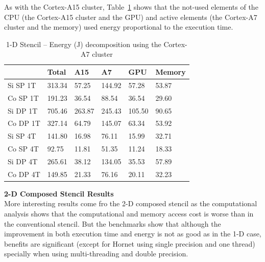 \documentclass{acm_proc_article-sp}
\begin{document}
As with the Cortex-A15 cluster, Table~\ref{tbl:energy-A7-1D} shows that the not-used elements of the CPU (the Cortex-A15 cluster and the GPU) and active elements (the Cortex-A7 cluster and the memory) used energy proportional to the execution time.
\begin{table}[ht]
  \begin{center}
    \begin{tabular}{| l | l | l | l | l | l |}
      \hline
      & Total & A15 & A7 & GPU & Memory \\ \hline
      Si SP 1T & 313.34 & 57.25  & 144.92 & 57.28  & 53.87 \\ \hline
      Co SP 1T & 191.23 & 36.54  & 88.54  & 36.54  & 29.60 \\ \hline
      Si DP 1T & 705.46 & 263.87 & 245.43 & 105.50 & 90.65 \\ \hline
      Co DP 1T & 327.14 & 64.79  & 145.07 & 63.34  & 53.92 \\ \hline
      Si SP 4T & 141.80 & 16.98  & 76.11  & 15.99  & 32.71 \\ \hline
      Co SP 4T & 92.75  & 11.81  & 51.35  & 11.24  & 18.33 \\ \hline
      Si DP 4T & 265.61 & 38.12  & 134.05 & 35.53  & 57.89 \\ \hline
      Co DP 4T & 149.85 & 21.33  & 76.16  & 20.11  & 32.23 \\ \hline
    \end{tabular}
    \caption{1-D Stencil -- Energy  (J) decomposition using the Cortex-A7 cluster}
    \label{tbl:energy-A7-1D}
  \end{center}
\end{table}



\noindent \textbf{2-D Composed Stencil Results} \\
More interesting results come fro the 2-D composed stencil as the computational analysis shows that the computational and memory access cost is worse than in the conventional stencil. But the benchmarks show that although the improvement in both execution time and energy is not as good as in the 1-D case, benefits are significant (except for Hornet using single precision and one thread) specially when using multi-threading and double precision.
\end{document}
